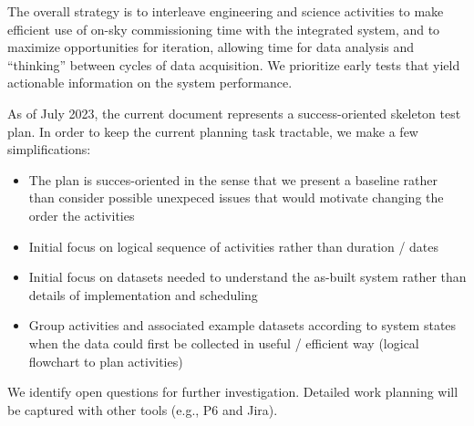 \documentclass[SE,authoryear,toc,lsstdraft]{lsstdoc}
\begin{document}
The overall strategy is to interleave engineering and science activities to make efficient use of on-sky commissioning time with the integrated system, and to maximize opportunities for iteration, allowing time for data analysis and ``thinking'' between cycles of data acquisition.
We prioritize early tests that yield actionable information on the system performance.



As of July 2023, the current document represents a success-oriented skeleton test plan.
In order to keep the current planning task tractable, we make a few simplifications:

\begin{itemize}

  \item The plan is succes-oriented in the sense that we present a baseline rather than consider possible unexpeced issues that would motivate changing the order the activities

  \item Initial focus on logical sequence of activities rather than duration / dates

  \item Initial focus on datasets needed to understand the as-built system rather than details of implementation and scheduling

  \item Group activities and associated example datasets according to system states when the data could first be collected in  useful / efficient way (logical flowchart to plan activities)

\end{itemize}

We identify open questions for further investigation.
Detailed work planning will be captured with other tools (e.g., P6 and Jira).

\end{document}
